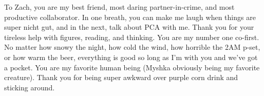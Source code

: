To Zach, you are my best friend, most daring partner-in-crime, and most productive collaborator. In one breath, you can make me laugh when things are super nicht gut, and in the next, talk about PCA with me. Thank you for your tireless help with figures, reading, and thinking. You are my number one co-first. No matter how snowy the night, how cold the wind, how horrible the 2AM p-set, or how warm the beer, everything is good so long as I'm with you and we've got a pocket. You are my favorite human being (Myshka obviously being my favorite creature). Thank you for being super awkward over purple corn drink and sticking around.


